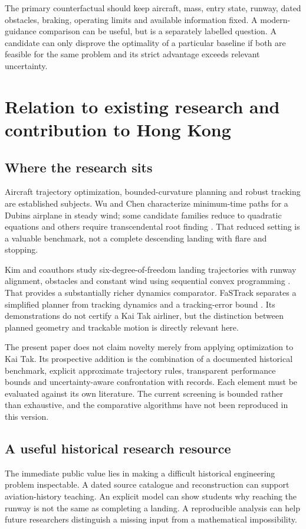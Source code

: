 The primary counterfactual should keep aircraft, mass, entry state, runway, dated obstacles, braking, operating limits and available information fixed. A modern-guidance comparison can be useful, but is a separately labelled question. A candidate can only disprove the optimality of a particular baseline if both are feasible for the same problem and its strict advantage exceeds relevant uncertainty.

\section{Relation to existing research and contribution to Hong Kong}
\label{sec:contribution}
\subsection{Where the research sits}
Aircraft trajectory optimization, bounded-curvature planning and robust tracking are established subjects. Wu and Chen characterize minimum-time paths for a Dubins airplane in steady wind; some candidate families reduce to quadratic equations and others require transcendental root finding \cite{wu}. That reduced setting is a valuable benchmark, not a complete descending landing with flare and stopping.

Kim and coauthors study six-degree-of-freedom landing trajectories with runway alignment, obstacles and constant wind using sequential convex programming \cite{kim}. That provides a substantially richer dynamics comparator. FaSTrack separates a simplified planner from tracking dynamics and a tracking-error bound \cite{fastrack}. Its demonstrations do not certify a Kai Tak airliner, but the distinction between planned geometry and trackable motion is directly relevant here.

The present paper does not claim novelty merely from applying optimization to Kai Tak. Its prospective addition is the combination of a documented historical benchmark, explicit approximate trajectory rules, transparent performance bounds and uncertainty-aware confrontation with records. Each element must be evaluated against its own literature. The current screening is bounded rather than exhaustive, and the comparative algorithms have not been reproduced in this version.

\subsection{A useful historical research resource}
The immediate public value lies in making a difficult historical engineering problem inspectable. A dated source catalogue and reconstruction can support aviation-history teaching. An explicit model can show students why reaching the runway is not the same as completing a landing. A reproducible analysis can help future researchers distinguish a missing input from a mathematical impossibility.

